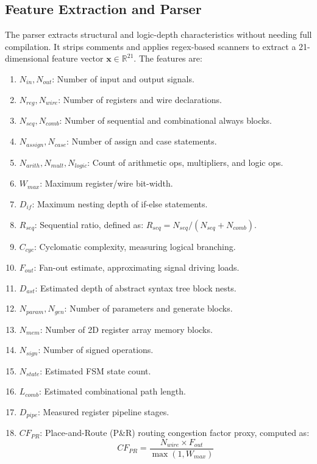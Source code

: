 \documentclass[conference]{IEEEtran}
\begin{document}
\subsection{Feature Extraction and Parser}
The parser extracts structural and logic-depth characteristics without needing full compilation. It strips comments and applies regex-based scanners to extract a 21-dimensional feature vector $\mathbf{x} \in \mathbb{R}^{21}$. The features are:
\begin{enumerate}
    \item $N_{in}, N_{out}$: Number of input and output signals.
    \item $N_{reg}, N_{wire}$: Number of registers and wire declarations.
    \item $N_{seq}, N_{comb}$: Number of sequential and combinational always blocks.
    \item $N_{assign}, N_{case}$: Number of assign and case statements.
    \item $N_{arith}, N_{mult}, N_{logic}$: Count of arithmetic ops, multipliers, and logic ops.
    \item $W_{max}$: Maximum register/wire bit-width.
    \item $D_{if}$: Maximum nesting depth of if-else statements.
    \item $R_{seq}$: Sequential ratio, defined as: $R_{seq} = N_{seq} / (N_{seq} + N_{comb})$.
    \item $C_{cyc}$: Cyclomatic complexity, measuring logical branching.
    \item $F_{out}$: Fan-out estimate, approximating signal driving loads.
    \item $D_{ast}$: Estimated depth of abstract syntax tree block nests.
    \item $N_{param}, N_{gen}$: Number of parameters and generate blocks.
    \item $N_{mem}$: Number of 2D register array memory blocks.
    \item $N_{sign}$: Number of signed operations.
    \item $N_{state}$: Estimated FSM state count.
    \item $L_{comb}$: Estimated combinational path length.
    \item $D_{pipe}$: Measured register pipeline stages.
    \item $CF_{PR}$: Place-and-Route (P\&R) routing congestion factor proxy, computed as:
    \begin{equation}
        CF_{PR} = \frac{N_{wire} \times F_{out}}{\max(1, W_{max})}
    \end{equation}
\end{enumerate}
\end{document}
